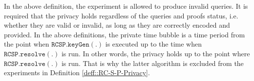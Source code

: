 \begin{definition}[RC-S-P Privacy]
\begin{enumerate}
%
%
%
%
%
%
%



\end{enumerate}
\end{definition}
 
In the above definition, the experiment is allowed to produce  invalid queries. It is required that  the privacy holds regardless of the queries and proofs  status, i.e. whether they are valid or invalid, as long as they are correctly encoded and provided. In the above definitions, the private time bubble is a time period from the point when $\mathtt{RCSP.keyGen}(.)$ is executed up to the time  when $\mathtt{RCSP}.\mathtt{resolve}(.)$  is run. In other words, the privacy holds up to the point where $\mathtt{RCSP}.\mathtt{resolve}(.)$  is run. That is why the latter algorithm is excluded from the  experiments in Definition \ref{deff::RC-S-P-Privacy}. 
 
